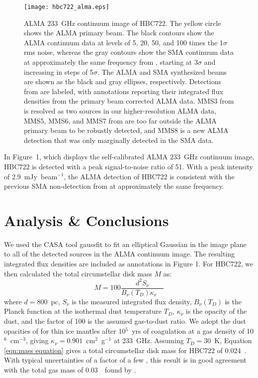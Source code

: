 \documentclass{aastex63}
\begin{document}
\begin{figure}[t]
    \centering
    \texttt{[image: hbc722\_alma.eps]}
    \caption{ALMA 233~GHz continuum image of HBC722.  The yellow circle shows the ALMA primary beam.  The black contours show the ALMA continuum data at levels of 5, 20, 50, and 100 times the 1$\sigma$ rms noise, whereas the gray contours show the SMA continuum data at approximately the same frequency from \citet{dunham2012:hbc722}, starting at 3$\sigma$ and increasing in steps of 5$\sigma$.  The ALMA and SMA synthesized beams are shown as the black and gray ellipses, respectively.  Detections from \citet{dunham2012:hbc722} are labeled, with annotations reporting their integrated flux densities from the primary beam corrected ALMA data.  MMS3 from \citet{dunham2012:hbc722} is resolved as two sources in our higher-resolution ALMA data, MMS5, MMS6, and MMS7 from \citet{dunham2012:hbc722} are too far outside the ALMA primary beam to be robustly detected, and MMS8 is a new ALMA detection that was only marginally detected in the SMA data.}
    \label{fig_continuum}
\end{figure}

In Figure~1, which displays the self-calibrated ALMA 233~GHz continuum image, HBC722 is detected with a peak signal-to-noise ratio of 51.  With a peak intensity of 2.9~mJy~beam$^{-1}$, the ALMA detection of HBC722 is consistent with the previous SMA non-detection from \citet{dunham2012:hbc722} at approximately the same frequency.

\section{Analysis \& Conclusions}\label{sec_analysis}
We used the CASA tool {\sc gaussfit} to fit an elliptical Gaussian in the image plane to all of the detected sources in the ALMA continuum image.  The resulting integrated flux densities are included as annotations in Figure 1.  For HBC722, we then calculated the total circumstellar disk mass $M$ as: 
\begin{equation}
    M=100\frac{d^2S_\nu}{B_\nu(T_D)\kappa_\nu\quad}
    \label{eqn:mass equation}
\end{equation}
where $d=800$~pc, $S_\nu$ is the measured integrated flux density, $B_\nu (T_D)$ is the Planck function at the isothermal dust temperature $T_D$, $\kappa_\nu$ is the opacity of the dust, and the factor of 100 is the assumed gas-to-dust ratio. We adopt the dust opacities of \citet{ossenkopf1994:oh5} for thin ice mantles after 10$^5$~yrs of coagulation at a gas density of 10$^6$~cm$^{-3}$, giving $\kappa_\nu=0.901$~cm$^2$~g$^{-1}$ at 233~GHz. Assuming $T_D=30$~K, Equation \ref{eqn:mass equation} gives a total circumstellar disk mass for HBC722 of 0.024~\msun.  With typical uncertainties of a factor of a few \citep{dunham2014:disks}, this result is in good agreement with the total gas mass of 0.03~\msun\ found by \citet{kospal2016:hbc722}.
\end{document}

